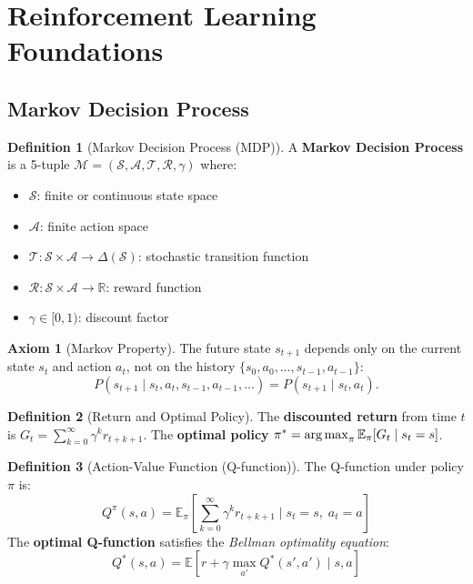 \documentclass[12pt,a4paper]{article}
\theoremstyle{definition}
\newtheorem{definition}{Definition}[section]
\newtheorem{axiom}{Axiom}[section]
\theoremstyle{plain}
\theoremstyle{remark}
\newcommand{\R}{\mathbb{R}}
\newcommand{\argmax}{\operatornamewithlimits{arg\,max}}
\newcommand{\EE}{\mathbb{E}}
\begin{document}
\newpage
\section{Reinforcement Learning Foundations}
\label{sec:rl_foundations}

\subsection{Markov Decision Process}

\begin{definition}[Markov Decision Process (MDP)]
A \textbf{Markov Decision Process} is a 5-tuple $\mathcal{M} = (\mathcal{S}, \mathcal{A}, \mathcal{T}, \mathcal{R}, \gamma)$ where:
\begin{itemize}[nosep]
  \item $\mathcal{S}$: finite or continuous state space
  \item $\mathcal{A}$: finite action space
  \item $\mathcal{T} : \mathcal{S} \times \mathcal{A} \to \Delta(\mathcal{S})$: stochastic transition function
  \item $\mathcal{R} : \mathcal{S} \times \mathcal{A} \to \R$: reward function
  \item $\gamma \in [0,1)$: discount factor
\end{itemize}
\end{definition}

\begin{axiom}[Markov Property]
The future state $s_{t+1}$ depends only on the current state $s_t$ and action $a_t$, not on the history $\{s_0, a_0, \ldots, s_{t-1}, a_{t-1}\}$:
\[
  P(s_{t+1} \mid s_t, a_t, s_{t-1}, a_{t-1}, \ldots) = P(s_{t+1} \mid s_t, a_t).
\]
\end{axiom}

\begin{definition}[Return and Optimal Policy]
The \textbf{discounted return} from time $t$ is $G_t = \sum_{k=0}^\infty \gamma^k r_{t+k+1}$.
The \textbf{optimal policy} $\pi^* = \argmax_\pi \EE_\pi[G_t \mid s_t = s]$.
\end{definition}

\begin{definition}[Action-Value Function (Q-function)]
The Q-function under policy $\pi$ is:
\[
  Q^\pi(s, a) = \EE_\pi\!\left[\sum_{k=0}^\infty \gamma^k r_{t+k+1} \;\bigg|\; s_t = s,\; a_t = a\right]
\]
The \textbf{optimal Q-function} satisfies the \emph{Bellman optimality equation}:
\[
  \boxed{Q^*(s, a) = \EE\!\left[r + \gamma \max_{a'} Q^*(s', a') \;\bigg|\; s, a\right]}
\]
\end{definition}
\end{document}
